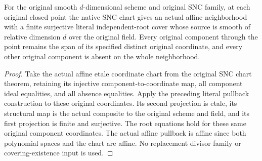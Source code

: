 \begin{lemma}
\label{lem:kn-nadel-kummer-snc-cover}
\leanok
{}
For the original smooth $d$-dimensional scheme and original SNC family,
at each original closed point the native SNC chart gives an actual
affine neighborhood with a finite surjective literal independent-root
cover whose source is smooth of relative dimension $d$ over the
original field.  Every original component through the point remains
the span of its specified distinct original coordinate, and every
other original component is absent on the whole neighborhood.
\end{lemma}
\begin{proof}
Take the actual affine etale coordinate chart from the original SNC
chart theorem, retaining its injective component-to-coordinate map,
all component ideal equalities, and all absence equalities.  Apply
the preceding literal pullback construction to these original
coordinates.  Its second projection is etale, its structural map
is the actual composite to the original scheme and field, and its
first projection is finite and surjective.  The root equations hold
for these same original component coordinates.  The actual affine
pullback is affine since both polynomial spaces and the chart are
affine.  No replacement divisor family or covering-existence input
is used.
\end{proof}

